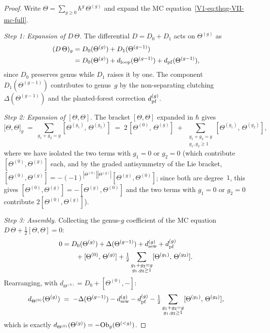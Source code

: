 \begin{proof}
Write $\Theta = \sum_{g \geq 0} \hbar^g\,\Theta^{(g)}$ and
expand the MC equation~\eqref{V1-eq:thqg-VII-mc-full}.

\medskip\noindent\emph{Step 1: Expansion of $D\,\Theta$.}
The differential $D = D_0 + D_1$ acts on $\Theta^{(g)}$ as
\begin{align}
(D\,\Theta)_g
&= D_0(\Theta^{(g)}) + D_1(\Theta^{(g-1)})\notag\\
&= D_0(\Theta^{(g)})
 + d_{\mathrm{loop}}(\Theta^{(g-1)})
 + d_{\mathrm{pf}}(\Theta^{(g-1)}),
\end{align}
since $D_0$ preserves genus while $D_1$ raises it by one.
The component $D_1(\Theta^{(g-1)})$ contributes to genus~$g$
by the non-separating clutching $\Delta(\Theta^{(g-1)})$ and
the planted-forest correction $d_{\mathrm{pf}}^{(g)}$.

\medskip\noindent\emph{Step 2: Expansion of $[\Theta,\Theta]$.}
The bracket $[\Theta,\Theta]$ expanded in $\hbar$ gives
\begin{equation}%
\bigl[\Theta,\Theta\bigr]_g
\;=\;
\sum_{g_1 + g_2 = g}
[\Theta^{(g_1)},\, \Theta^{(g_2)}]
\;=\;
2\,[\Theta^{(0)},\, \Theta^{(g)}]
\;+\;
\sum_{\substack{g_1 + g_2 = g \\ g_1, g_2 \geq 1}}
[\Theta^{(g_1)},\, \Theta^{(g_2)}],
\end{equation}
where we have isolated the two terms with $g_1 = 0$ or
$g_2 = 0$ (which contribute $[\Theta^{(0)}, \Theta^{(g)}]$
each, and by the graded antisymmetry of the Lie bracket,
$[\Theta^{(0)}, \Theta^{(g)}] = -(-1)^{|\Theta^{(0)}|
|\Theta^{(g)}|}[\Theta^{(g)}, \Theta^{(0)}]$; since both
are degree~$1$, this gives $[\Theta^{(0)}, \Theta^{(g)}]
= -[\Theta^{(g)}, \Theta^{(0)}]$ and the two terms with
$g_1 = 0$ or $g_2 = 0$ contribute
$2[\Theta^{(0)}, \Theta^{(g)}]$).

\medskip\noindent\emph{Step 3: Assembly.}
Collecting the genus-$g$ coefficient of the MC equation
$D\,\Theta + \tfrac{1}{2}[\Theta,\Theta] = 0$:
\begin{align}
0 &= D_0(\Theta^{(g)})
 + \Delta(\Theta^{(g-1)})
 + d_{\mathrm{sew}}^{(g)} + d_{\mathrm{pf}}^{(g)}
 \notag\\
 &\qquad
 + [\Theta^{(0)},\, \Theta^{(g)}]
 + \tfrac{1}{2}
 \sum_{\substack{g_1 + g_2 = g \\ g_1, g_2 \geq 1}}
 [\Theta^{(g_1)},\, \Theta^{(g_2)}].
\end{align}
Rearranging, with $d_{\Theta^{(0)}} = D_0 +
[\Theta^{(0)}, -]$:
\begin{equation}%
d_{\Theta^{(0)}}(\Theta^{(g)})
\;=\;
-\Delta(\Theta^{(g-1)})
- \dsew^{(g)} - \dpf^{(g)}
- \tfrac{1}{2}
 \sum_{\substack{g_1 + g_2 = g \\ g_1, g_2 \geq 1}}
 [\Theta^{(g_1)},\, \Theta^{(g_2)}],
\end{equation}
which is exactly $d_{\Theta^{(0)}}(\Theta^{(g)}) = -\mathrm{Ob}_g(\Theta^{(<g)})$.


\end{proof}
